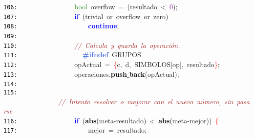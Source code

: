 \documentclass[a4paper,10pt]{scrartcl}
\begin{document}
{   \mbox{}\texttt{\textcolor{Black}{106:}} \ \ \ \ \ \ \ \ \ \ \ \ \ \ \ \ \textcolor{ForestGreen}{bool}\ overflow\ \textcolor{BrickRed}{=}\ \textcolor{BrickRed}{(}resultado\ \textcolor{BrickRed}{\textless{}}\ \textcolor{Purple}{0}\textcolor{BrickRed}{);} \\
   \mbox{}\texttt{\textcolor{Black}{107:}} \ \ \ \ \ \ \ \ \ \ \ \ \ \ \ \ \textbf{\textcolor{Blue}{if}}\ \textcolor{BrickRed}{(}trivial\ or\ overflow\ \textcolor{TealBlue}{or}\ zero\textcolor{BrickRed}{)} \\
   \mbox{}\texttt{\textcolor{Black}{108:}} \ \ \ \ \ \ \ \ \ \ \ \ \ \ \ \ \ \ \ \ \textbf{\textcolor{Blue}{continue}}\textcolor{BrickRed}{;} \\
   \mbox{}\texttt{\textcolor{Black}{109:}} \ \ \ \ \ \ \ \ \ \  \\
   \mbox{}\texttt{\textcolor{Black}{110:}} \ \ \ \ \ \ \ \ \ \ \ \ \ \ \ \ \textit{\textcolor{Brown}{//\ Calcula\ y\ guarda\ la\ operación.}} \\
   \mbox{}\texttt{\textcolor{Black}{111:}} \textbf{\textcolor{RoyalBlue}{\ \ \ \ \ \ \ \ \ \ \ \ \ \ \ \ \#ifndef}}\ GRUPOS\ \ \ \ \ \ \ \ \ \  \\
   \mbox{}\texttt{\textcolor{Black}{112:}} \ \ \ \ \ \ \ \ \ \ \ \ \ \ \ \ opActual\ \textcolor{BrickRed}{=}\ \textcolor{Red}{\{}c\textcolor{BrickRed}{,}\ d\textcolor{BrickRed}{,}\ SIMBOLOS\textcolor{BrickRed}{[}op\textcolor{BrickRed}{],}\ resultado\textcolor{Red}{\}}\textcolor{BrickRed}{;} \\
   \mbox{}\texttt{\textcolor{Black}{113:}} \ \ \ \ \ \ \ \ \ \ \ \ \ \ \ \ operaciones\textcolor{BrickRed}{.}\textbf{\textcolor{Black}{push$\_$back}}\textcolor{BrickRed}{(}opActual\textcolor{BrickRed}{);} \\
   \mbox{}\texttt{\textcolor{Black}{114:}} \ \ \ \ \ \ \ \ \ \ \ \  \\
   \mbox{}\texttt{\textcolor{Black}{115:}} \ \ \ \ \ \ \ \ \ \ \ \ \ \ \ \ \textit{\textcolor{Brown}{//\ Intenta\ resolver\ o\ mejorar\ con\ el\ nuevo\ número,\ sin\ pasarse}} \\
   \mbox{}\texttt{\textcolor{Black}{116:}} \ \ \ \ \ \ \ \ \ \ \ \ \ \ \ \ \textbf{\textcolor{Blue}{if}}\ \textcolor{BrickRed}{(}\textbf{\textcolor{Black}{abs}}\textcolor{BrickRed}{(}meta\textcolor{BrickRed}{-}resultado\textcolor{BrickRed}{)}\ \textcolor{BrickRed}{\textless{}}\ \textbf{\textcolor{Black}{abs}}\textcolor{BrickRed}{(}meta\textcolor{BrickRed}{-}mejor\textcolor{BrickRed}{))}\ \textcolor{Red}{\{} \\
   \mbox{}\texttt{\textcolor{Black}{117:}} \ \ \ \ \ \ \ \ \ \ \ \ \ \ \ \ \ \ \ \ mejor\ \textcolor{BrickRed}{=}\ resultado\textcolor{BrickRed}{;} \\
}
\end{document}
